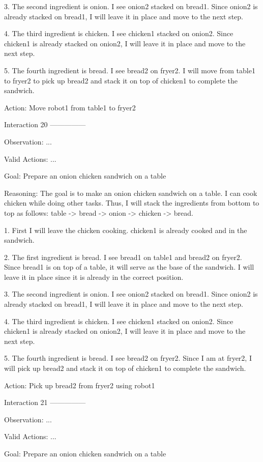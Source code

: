 3. The second ingredient is onion. I see onion2 stacked on bread1. Since onion2 is already stacked on bread1, I will leave it in place and move to the next step.

4. The third ingredient is chicken. I see chicken1 stacked on onion2. Since chicken1 is already stacked on onion2, I will leave it in place and move to the next step.

5. The fourth ingredient is bread. I see bread2 on fryer2. I will move from table1 to fryer2 to pick up bread2 and stack it on top of chicken1 to complete the sandwich.

Action: Move robot1 from table1 to fryer2


Interaction 20
---------------


Observation: ...

Valid Actions: ...

Goal: Prepare an onion chicken sandwich on a table


Reasoning: The goal is to make an onion chicken sandwich on a table. I can cook chicken while doing other tasks. Thus, I
will stack the ingredients from bottom to top as follows: table -> bread -> onion -> chicken -> bread.

1. First I will leave the chicken cooking. chicken1 is already cooked and in the sandwich.

2. The first ingredient is bread. I see bread1 on table1 and bread2 on fryer2. Since bread1 is on top of a table, it will serve as the base of the sandwich. I will leave it in place since it is already in the correct position.

3. The second ingredient is onion. I see onion2 stacked on bread1. Since onion2 is already stacked on bread1, I will leave it in place and move to the next step.

4. The third ingredient is chicken. I see chicken1 stacked on onion2. Since chicken1 is already stacked on onion2, I will leave it in place and move to the next step.

5. The fourth ingredient is bread. I see bread2 on fryer2. Since I am at fryer2, I will pick up bread2 and stack it on top of chicken1 to complete the sandwich.

Action: Pick up bread2 from fryer2 using robot1


Interaction 21
---------------


Observation: ...

Valid Actions: ...

Goal: Prepare an onion chicken sandwich on a table


